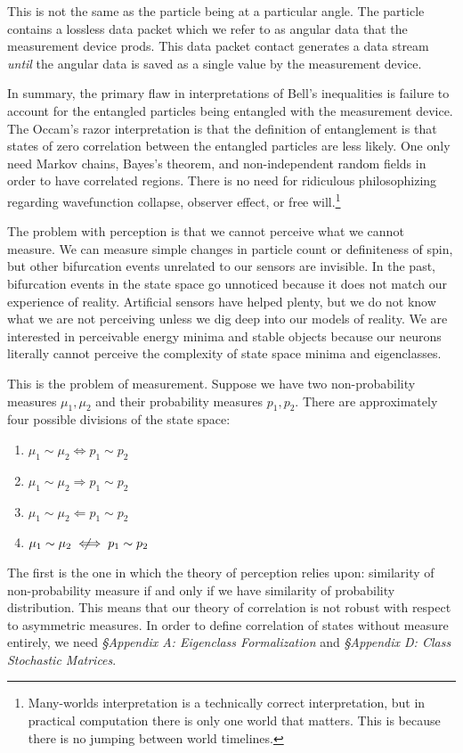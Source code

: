 \documentclass[10pt, a5paper, twoside, openright]{memoir}
\newcommand{\notiff}{%
  \mathrel{{\ooalign{\hidewidth$\not\phantom{=}$\hidewidth\cr$\iff$}}}}
\begin{document}
This is not the same as the particle being at a particular angle. The particle contains a lossless data packet which we refer to as angular data that the measurement device prods. This data packet contact generates a data stream \textit{until} the angular data is saved as a single value by the measurement device.

In summary, the primary flaw in interpretations of Bell's inequalities is failure to account for the entangled particles being entangled with the measurement device. The Occam's razor interpretation is that the definition of entanglement is that states of zero correlation between the entangled particles are less likely. One only need Markov chains, Bayes's theorem, and non-independent random fields in order to have correlated regions. There is no need for ridiculous philosophizing regarding wavefunction collapse, observer effect, or free will.\footnote{Many-worlds interpretation is a technically correct interpretation, but in practical computation there is only one world that matters. This is because there is no jumping between world timelines.}

The problem with perception is that we cannot perceive what we cannot measure. We can measure simple changes in particle count or definiteness of spin, but other bifurcation events unrelated to our sensors are invisible. In the past, bifurcation events in the state space go unnoticed because it does not match our experience of reality. Artificial sensors have helped plenty, but we do not know what we are not perceiving unless we dig deep into our models of reality. We are interested in perceivable energy minima and stable objects because our neurons literally cannot perceive the complexity of state space minima and eigenclasses.

This is the problem of measurement. Suppose we have two non-probability measures $\mu_1, \mu_2$ and their probability measures $p_1, p_2$. There are approximately four possible divisions of the state space:
\begin{enumerate}
\item $\mu_1 \sim \mu_2 \iff p_1 \sim p_2$
\item $\mu_1 \sim \mu_2 \Rightarrow p_1 \sim p_2$
\item $\mu_1 \sim \mu_2 \Leftarrow p_1 \sim p_2$
\item $\mu_1 \sim \mu_2 \notiff p_1 \sim p_2$
\end{enumerate}
The first is the one in which the theory of perception relies upon: similarity of non-probability measure if and only if we have similarity of probability distribution. This means that our theory of correlation is not robust with respect to asymmetric measures. In order to define correlation of states without measure entirely, we need \textit{\S Appendix A: Eigenclass Formalization} and \textit{\S Appendix D: Class Stochastic Matrices}.
\end{document}
